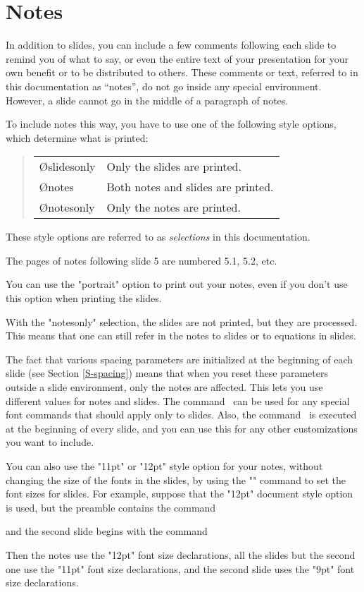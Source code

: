 \section{Notes\label{S-notes}}

In addition to slides, you can include a few comments following each slide to
remind you of what to say, or even the entire text of your presentation for
your own benefit or to be distributed to others. These comments or text,
referred to in this documentation as ``notes'', do not go inside any special
environment. However, a slide cannot go in the middle of a paragraph of notes.

To include notes this way, you have to use one of the following style options,
which determine what is printed:
\begin{quote}
  \begin{tabular}{ll}
    \O{slidesonly} & Only the slides are printed.\\
    \O{notes} & Both notes and slides are printed.\\
    \O{notesonly} & Only the notes are printed.\\
  \end{tabular}
\end{quote}
These style options are referred to as {\em selections} in this documentation.

The pages of notes following slide 5 are numbered 5.1, 5.2, etc.

You can use the "portrait" option to print out your notes, even if you don't
use this option when printing the slides.

With the "notesonly" selection, the slides are not printed, but they are
processed. This means that one can still refer in the notes to slides or to
equations in slides.

The fact that various spacing parameters are initialized at the beginning of
each slide (see Section \ref{S-spacing}) means that when you reset these
parameters outside a slide environment, only the notes are affected. This lets
you use different values for notes and slides. The command \N\slidefonts\ can
be used for any special font commands that should apply only to slides. Also,
the command \N\everyslide\ is executed at the beginning of every slide, and
you can use this for any other customizations you want to include.

You can also use the "11pt" or "12pt" style option for your notes, without
changing the size of the fonts in the slides, by using the "\ptsize" command
to set the font sizes for slides. For example, suppose that the "12pt"
document style option is used, but the preamble contains  the command
\begin{LVerbatim}
\end{LVerbatim}
and the second slide begins with the command
\begin{LVerbatim}
\end{LVerbatim}
Then the notes use the "12pt" font size declarations, all the slides but the
second one use the "11pt" font size declarations, and the second slide uses
the "9pt" font size declarations.

